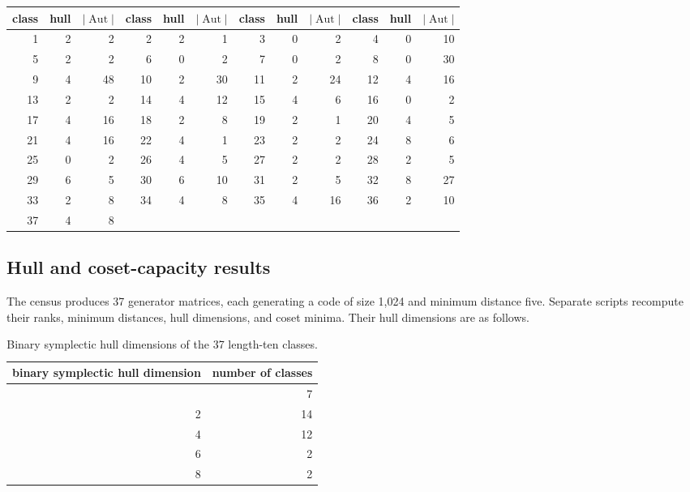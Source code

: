 \documentclass[11pt]{article}
\begin{document}
{\small
\setlength{\tabcolsep}{5pt}
\begin{center}
\label{tab:aut}
\begin{tabular}{@{}rrr@{\hspace{14pt}}rrr@{\hspace{14pt}}rrr@{\hspace{14pt}}rrr@{}}
\toprule
class & hull & \(\lvert\operatorname{Aut}\rvert\) & class & hull & \(\lvert\operatorname{Aut}\rvert\) & class & hull & \(\lvert\operatorname{Aut}\rvert\) & class & hull & \(\lvert\operatorname{Aut}\rvert\) \\
\midrule
1 & 2 & 2 & 2 & 2 & 1 & 3 & 0 & 2 & 4 & 0 & 10 \\
5 & 2 & 2 & 6 & 0 & 2 & 7 & 0 & 2 & 8 & 0 & 30 \\
9 & 4 & 48 & 10 & 2 & 30 & 11 & 2 & 24 & 12 & 4 & 16 \\
13 & 2 & 2 & 14 & 4 & 12 & 15 & 4 & 6 & 16 & 0 & 2 \\
17 & 4 & 16 & 18 & 2 & 8 & 19 & 2 & 1 & 20 & 4 & 5 \\
21 & 4 & 16 & 22 & 4 & 1 & 23 & 2 & 2 & 24 & 8 & 6 \\
25 & 0 & 2 & 26 & 4 & 5 & 27 & 2 & 2 & 28 & 2 & 5 \\
29 & 6 & 5 & 30 & 6 & 10 & 31 & 2 & 5 & 32 & 8 & 27 \\
33 & 2 & 8 & 34 & 4 & 8 & 35 & 4 & 16 & 36 & 2 & 10 \\
37 & 4 & 8 &  &  &  &  &  &  &  &  &  \\
\bottomrule
\end{tabular}
\end{center}
}

\subsection{Hull and coset-capacity results}\label{hull-and-coset-capacity-results}

The census produces 37 generator matrices, each generating a code of size 1,024 and minimum distance five. Separate scripts recompute their ranks, minimum distances, hull dimensions, and coset minima. Their hull dimensions are as follows.

{
\begin{longtable}[]{@{}rr@{}}
\caption{Binary symplectic hull dimensions of the 37 length-ten classes.}
\label{tab:hull}\\
\toprule\noalign{}
binary symplectic hull dimension & number of classes \\
\midrule\noalign{}
\endhead
\bottomrule\noalign{}
\endlastfoot
0 & 7 \\
2 & 14 \\
4 & 12 \\
6 & 2 \\
8 & 2 \\
\end{longtable}
}
\end{document}
